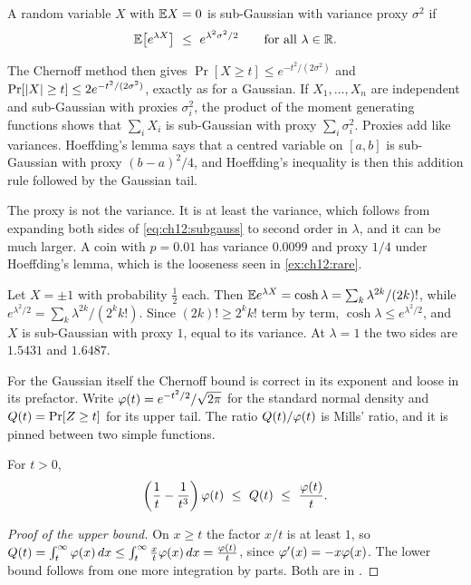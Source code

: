 \begin{definition}\label{def:ch12:subgauss}
A random variable $X$ with $\mathbb{E} X=0$ is sub-Gaussian with variance proxy $\sigma^2$ if
\begin{equation}
\E\big[e^{\lambda X}\big]\ \le\ e^{\lambda^2\sigma^2/2}\qquad\text{for all }\lambda\in\R.
\label{eq:ch12:subgauss}
\end{equation}
\end{definition}
The Chernoff method then gives $\Pr[X\ge t]\le e^{-t^2/(2\sigma^2)}$ and $\Pr[\lvert X\rvert\ge t]\le2e^{-t^2/(2\sigma^2)}$, exactly as for a Gaussian. If $X_1,\dots,X_n$ are independent and sub-Gaussian with proxies $\sigma_i^2$, the product of the moment generating functions shows that $\sum_iX_i$ is sub-Gaussian with proxy $\sum_i\sigma_i^2$. Proxies add like variances. Hoeffding's lemma says that a centred variable on $[a,b]$ is sub-Gaussian with proxy $(b-a)^2/4$, and Hoeffding's inequality is then this addition rule followed by the Gaussian tail.

The proxy is not the variance. It is at least the variance, which follows from expanding both sides of \cref{eq:ch12:subgauss} to second order in $\lambda$, and it can be much larger. A coin with $p=0.01$ has variance $0.0099$ and proxy $1/4$ under Hoeffding's lemma, which is the looseness seen in \cref{ex:ch12:rare}.

\begin{example}\label{ex:ch12:rademacher}
Let $X=\pm1$ with probability $\tfrac12$ each. Then $\mathbb{E} e^{\lambda X}=\cosh\lambda=\sum_k\lambda^{2k}/(2k)!$, while $e^{\lambda^2/2}=\sum_k\lambda^{2k}/(2^kk!)$. Since $(2k)!\ge2^kk!$ term by term, $\cosh\lambda\le e^{\lambda^2/2}$, and $X$ is sub-Gaussian with proxy $1$, equal to its variance. At $\lambda=1$ the two sides are $1.5431$ and $1.6487$.
\end{example}

For the Gaussian itself the Chernoff bound is correct in its exponent and loose in its prefactor. Write $\varphi(t)=e^{-t^2/2}/\sqrt{2\pi}$ for the standard normal density and $Q(t)=\Pr[Z\ge t]$ for its upper tail. The ratio $Q(t)/\varphi(t)$ is Mills' ratio, and it is pinned between two simple functions.
\begin{proposition}\label{prop:ch12:mills}
For $t>0$,
\begin{equation}
\left(\frac1t-\frac1{t^3}\right)\stdpdf(t)\ \le\ \Qf(t)\ \le\ \frac{\stdpdf(t)}t.
\label{eq:ch12:mills}
\end{equation}
\end{proposition}
\begin{proof}[Proof of the upper bound]
On $x\ge t$ the factor $x/t$ is at least $1$, so $Q(t)=\int_t^\infty\varphi(x)\,dx\le\int_t^\infty\frac xt\varphi(x)\,dx=\frac{\varphi(t)}t$, since $\varphi'(x)=-x\varphi(x)$. The lower bound follows from one more integration by parts. Both are in \citet{vershynin2018}.
\end{proof}

